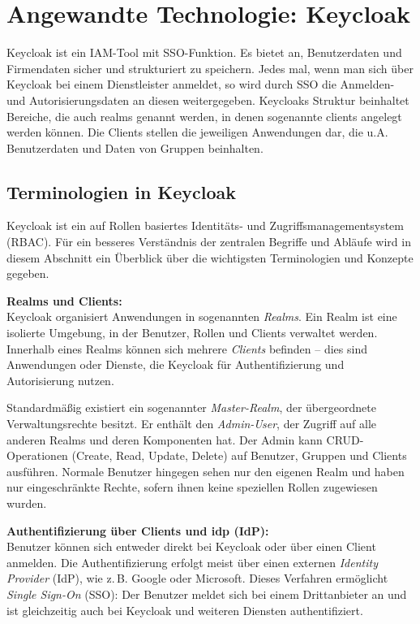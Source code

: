 \documentclass[a4paper,12pt]{article}
\begin{document}
	\section{Angewandte Technologie: Keycloak}
	Keycloak ist ein IAM-Tool mit SSO-Funktion. Es bietet an, Benutzerdaten und Firmendaten sicher und strukturiert zu speichern. Jedes mal, wenn man sich über Keycloak bei einem Dienstleister anmeldet, so wird durch SSO die Anmelden- und Autorisierungsdaten an diesen weitergegeben.
	Keycloaks Struktur beinhaltet Bereiche, die auch \gls{realm}s genannt werden, in denen sogenannte \gls{client}s angelegt werden können. Die Clients stellen die jeweiligen Anwendungen dar, die u.A. Benutzerdaten und Daten von Gruppen beinhalten. 
	
	\subsection{Terminologien in Keycloak}
	Keycloak ist ein auf Rollen basiertes Identitäts- und Zugriffsmanagementsystem (RBAC). Für ein besseres Verständnis der zentralen Begriffe und Abläufe wird in diesem Abschnitt ein Überblick über die wichtigsten Terminologien und Konzepte gegeben.
	
	\vspace{0.5em}
	\textbf{Realms und Clients:}\\
	Keycloak organisiert Anwendungen in sogenannten \textit{Realms}. Ein Realm ist eine isolierte Umgebung, in der Benutzer, Rollen und Clients verwaltet werden. Innerhalb eines Realms können sich mehrere \textit{Clients} befinden – dies sind Anwendungen oder Dienste, die Keycloak für Authentifizierung und Autorisierung nutzen.
	
	Standardmäßig existiert ein sogenannter \textit{Master-Realm}, der übergeordnete Verwaltungsrechte besitzt. Er enthält den \textit{Admin-User}, der Zugriff auf alle anderen Realms und deren Komponenten hat. Der Admin kann CRUD-Operationen (Create, Read, Update, Delete) auf Benutzer, Gruppen und Clients ausführen. Normale Benutzer hingegen sehen nur den eigenen Realm und haben nur eingeschränkte Rechte, sofern ihnen keine speziellen Rollen zugewiesen wurden.
	
	\vspace{0.5em}
	\textbf{Authentifizierung über Clients und \gls{idp} (IdP):}\\
	Benutzer können sich entweder direkt bei Keycloak oder über einen Client anmelden. Die Authentifizierung erfolgt meist über einen externen \textit{Identity Provider} (IdP), wie z.\,B. Google oder Microsoft. Dieses Verfahren ermöglicht \textit{Single Sign-On} (SSO): Der Benutzer meldet sich bei einem Drittanbieter an und ist gleichzeitig auch bei Keycloak und weiteren Diensten authentifiziert.
	
\end{document}

